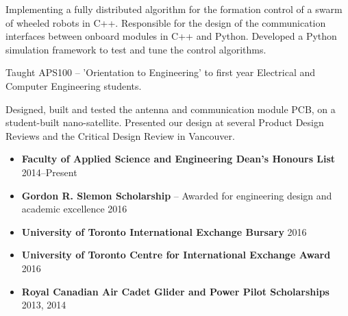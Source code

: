 \documentclass{ResumeTemplate}
\begin{document}
	\begin{tcolorbox}[colback=blue!5!white,colframe=blue!75!black,title=PROJECTS AND TEACHING]
	

	\workitemsthree
	{Implementing a fully distributed algorithm for the formation control of a swarm of wheeled robots in C++.}
	{Responsible for the design of the communication interfaces between onboard modules in C++ and Python.}
	{Developed a Python simulation framework to test and tune the control algorithms. }
	

	\workitemsone
	{Taught APS100 -- 'Orientation to Engineering' to first year Electrical and Computer Engineering students.}
	

	\workitemstwo
	{Designed, built and tested the antenna and communication module PCB, on a student-built nano-satellite.}
	{Presented our design at several Product Design Reviews and the Critical Design Review in Vancouver.}
	~
	\end{tcolorbox}

	

	\begin{tcolorbox}[colback=blue!5!white,colframe=blue!75!black,title=SCHOLARSHIPS AND AWARDS]
	\begin{itemize}[noitemsep, leftmargin=*]
		\item \textbf{Faculty of Applied Science and Engineering Dean's Honours List} \hfill 2014--Present
		\item \textbf{Gordon R. Slemon Scholarship} -- Awarded for engineering design and academic excellence \hfill 2016
		\item \textbf{University of Toronto International Exchange Bursary} \hfill 2016
		\item \textbf{University of Toronto Centre for International Exchange Award} \hfill 2016
		\item \textbf{Royal Canadian Air Cadet Glider and Power Pilot Scholarships} \hfill 2013, 2014\vspace*{-\baselineskip}
	\end{itemize}
	~
	\end{tcolorbox}
	
\end{document}
